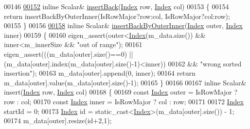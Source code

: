 \begin{DoxyCode}
00146 
\hyperlink{class_eigen_1_1_dynamic_sparse_matrix_a0a556652195b91c09e9f6c4d8b7cc81d}{00152}     \textcolor{keyword}{inline} Scalar& \hyperlink{class_eigen_1_1_dynamic_sparse_matrix_a0a556652195b91c09e9f6c4d8b7cc81d}{insertBack}(\hyperlink{group___core___module_a554f30542cc2316add4b1ea0a492ff02}{Index} row, \hyperlink{group___core___module_a554f30542cc2316add4b1ea0a492ff02}{Index} col)
00153     \{
00154       \textcolor{keywordflow}{return} insertBackByOuterInner(IsRowMajor?row:col, IsRowMajor?col:row);
00155     \}
00156 
\hyperlink{class_eigen_1_1_dynamic_sparse_matrix_ac97c2463058ae55d7f0ef21c851eb5f3}{00158}     \textcolor{keyword}{inline} Scalar& \hyperlink{class_eigen_1_1_dynamic_sparse_matrix_ac97c2463058ae55d7f0ef21c851eb5f3}{insertBackByOuterInner}(\hyperlink{group___core___module_a554f30542cc2316add4b1ea0a492ff02}{Index} outer, 
      \hyperlink{group___core___module_a554f30542cc2316add4b1ea0a492ff02}{Index} inner)
00159     \{
00160       eigen\_assert(outer<\hyperlink{namespace_eigen_a62e77e0933482dafde8fe197d9a2cfde}{Index}(m\_data.size()) && inner<m\_innerSize && \textcolor{stringliteral}{"out of range"});
00161       eigen\_assert(((m\_data[outer].size()==0) || (m\_data[outer].index(m\_data[outer].size()-1)<inner))
00162                 && \textcolor{stringliteral}{"wrong sorted insertion"});
00163       m\_data[outer].append(0, inner);
00164       \textcolor{keywordflow}{return} m\_data[outer].value(m\_data[outer].size()-1);
00165     \}
00166 
00167     \textcolor{keyword}{inline} Scalar& insert(\hyperlink{group___core___module_a554f30542cc2316add4b1ea0a492ff02}{Index} row, \hyperlink{group___core___module_a554f30542cc2316add4b1ea0a492ff02}{Index} col)
00168     \{
00169       \textcolor{keyword}{const} \hyperlink{group___core___module_a554f30542cc2316add4b1ea0a492ff02}{Index} outer = IsRowMajor ? row : col;
00170       \textcolor{keyword}{const} \hyperlink{group___core___module_a554f30542cc2316add4b1ea0a492ff02}{Index} inner = IsRowMajor ? col : row;
00171 
00172       \hyperlink{group___core___module_a554f30542cc2316add4b1ea0a492ff02}{Index} startId = 0;
00173       \hyperlink{group___core___module_a554f30542cc2316add4b1ea0a492ff02}{Index} \textcolor{keywordtype}{id} = \textcolor{keyword}{static\_cast<}\hyperlink{group___core___module_a554f30542cc2316add4b1ea0a492ff02}{Index}\textcolor{keyword}{>}(m\_data[outer].size()) - 1;
00174       m\_data[outer].resize(\textcolor{keywordtype}{id}+2,1);

\end{DoxyCode}
